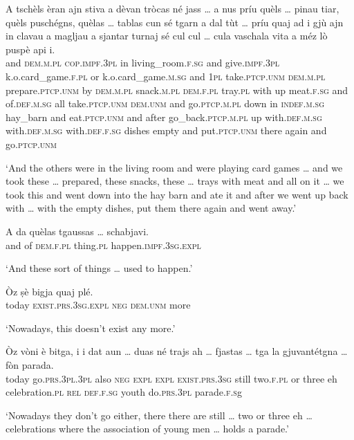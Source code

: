 \begin{linenumbers}
	\gll    A tschèls èran ajn stiva a dèvan tròcas né jass … a nus príu quèls … pinau tiar, quèls puschégns, quèlas … tablas cun sé tgarn a dal tùt … príu quaj ad i gjù ajn in clavau a magljau a sjantar turnaj sé cul cul … cula vaschala vita a méz lò puspè api i.\\
	and \textsc{dem.m.pl} \textsc{cop.impf.3pl} in living\_room.\textsc{f.sg} and give.\textsc{impf.3pl} k.o.card\_game.\textsc{f.pl} or k.o.card\_game.\textsc{m.sg} {} and \textsc{1pl} take.\textsc{ptcp.unm} \textsc{dem.m.pl} {} prepare.\textsc{ptcp.unm} by \textsc{dem.m.pl} snack.\textsc{m.pl}  \textsc{dem.f.pl} {} tray.\textsc{pl} with up meat.\textsc{f.sg} and of.\textsc{def.m.sg} all {} take.\textsc{ptcp.unm} \textsc{dem.unm} and go.\textsc{ptcp.m.pl} down in \textsc{indef.m.sg} hay\_barn and eat.\textsc{ptcp.unm} and after go\_back.\textsc{ptcp.m.pl} up with.\textsc{def.m.sg} with.\textsc{def.m.sg} {} with.\textsc{def.f.sg} dishes empty and put.\textsc{ptcp.unm} there again and go.\textsc{ptcp.unm}\\
\end{linenumbers}
\medskip
\glt `And the others were in the living room and were playing card games … and we took these … prepared, these snacks, these … trays with meat and all on it … we took this and went down into the hay barn and ate it and after we went up back with … with the empty dishes, put them there again and went away.'
\medskip

\begin{linenumbers}
	\gll    A da quèlas tgaussas …  schabjavi.\\
	and of  \textsc{dem.f.pl} thing.\textsc{pl} {} happen.\textsc{impf.3sg.expl}\\
\end{linenumbers}
\medskip
\glt `And these sort of things … used to happen.'
\medskip

\begin{linenumbers}
	\gll    Òz ṣè bigja quaj plé.\\
	today \textsc{exist.prs.3sg.expl} \textsc{neg} \textsc{dem.unm} more \\
\end{linenumbers}
\medskip
\glt `Nowadays, this doesn’t exist any more.'
\medskip

\begin{linenumbers}
	\gll    Òz vòni è bitga, i i dat aun … duas né trajs ah … fjastas … tga la gjuvantétgna … fòn parada.\\
	today go.\textsc{prs.3pl.3pl} also \textsc{neg} \textsc{expl} \textsc{expl} \textsc{exist.prs.3sg} still {} two.\textsc{f.pl} or three eh {} celebration.\textsc{pl} {} \textsc{rel} \textsc{def.f.sg} youth {} do.\textsc{prs.3pl} parade.\textsc{f.s}g\\
\end{linenumbers}
\medskip
\glt `Nowadays they don’t go either, there there are still … two or three eh … celebrations where the association of young men … holds a parade.'
\medskip

